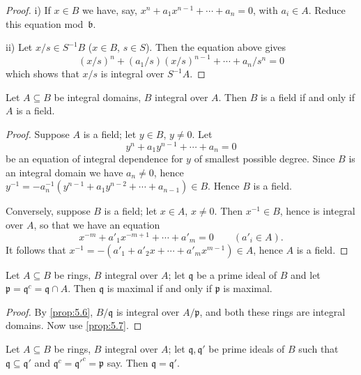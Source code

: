 \begin{proof}
i) If $x \in B$ we have, say, $x^n + a_1 x^{n-1} + \cdots + a_n = 0$, with $a_i \in A$. Reduce this equation mod~$\mathfrak{b}$.

ii) Let $x/s \in S^{-1}B$ ($x \in B$, $s \in S$). Then the equation above gives
\[
(x/s)^n + (a_1/s)(x/s)^{n-1} + \cdots + a_n/s^n = 0
\]
which shows that $x/s$ is integral over $S^{-1}A$.
\end{proof}


\begin{proposition}\label{prop:5.7}
Let $A \subseteq B$ be integral domains, $B$ integral over $A$. Then $B$ is a field if and only if $A$ is a field.
\end{proposition}

\begin{proof}
Suppose $A$ is a field; let $y \in B$, $y \neq 0$. Let
\[
y^n + a_1 y^{n-1} + \cdots + a_n = 0
\]
be an equation of integral dependence for $y$ of smallest possible degree. Since $B$ is an integral domain we have $a_n \neq 0$, hence $y^{-1} = -a_n^{-1}(y^{n-1} + a_1 y^{n-2} + \cdots + a_{n-1}) \in B$. Hence $B$ is a field.

Conversely, suppose $B$ is a field; let $x \in A$, $x \neq 0$. Then $x^{-1} \in B$, hence is integral over $A$, so that we have an equation
\[
x^{-m} + a'_1 x^{-m+1} + \cdots + a'_m = 0 \qquad (a'_i \in A).
\]
It follows that $x^{-1} = -(a'_1 + a'_2 x + \cdots + a'_m x^{m-1}) \in A$, hence $A$ is a field.
\end{proof}

\begin{corollary}\label{cor:5.8}
    Let $A \subseteq B$ be rings, $B$ integral over $A$; let $\mathfrak{q}$ be a prime ideal of $B$ and let $\mathfrak{p} = \mathfrak{q}^c = \mathfrak{q} \cap A$. Then $\mathfrak{q}$ is maximal if and only if $\mathfrak{p}$ is maximal.
\end{corollary}

\begin{proof}
    By \eqref{prop:5.6}, $B/\mathfrak{q}$ is integral over $A/\mathfrak{p}$, and both these rings are integral domains. Now use \eqref{prop:5.7}.
\end{proof}

\begin{corollary}\label{cor:5.9}
    Let $A \subseteq B$ be rings, $B$ integral over $A$; let $\mathfrak{q}, \mathfrak{q}'$ be prime ideals of $B$ such that $\mathfrak{q} \subseteq \mathfrak{q}'$ and $\mathfrak{q}^c = \mathfrak{q}'^c = \mathfrak{p}$ say. Then $\mathfrak{q} = \mathfrak{q}'$.
\end{corollary}

